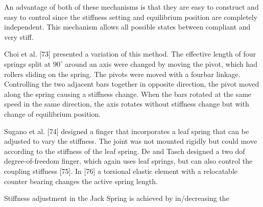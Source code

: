 \documentclass[10pt]{article}
\begin{document}
An advantage of both of these mechanisms is that they are easy to construct and easy to control since the stiffness setting and equilibrium position are completely independent. This mechanism allows all possible states between compliant and very stiff.

Choi et al. [73] presented a variation of this method. The effective length of four springs split at $90^{\circ}$ around an axis were changed by moving the pivot, which had rollers sliding on the spring. The pivots were moved with a fourbar linkage. Controlling the two adjacent bars together in opposite direction, the pivot moved along the spring causing a stiffness change. When the bars rotated at the same speed in the same direction, the axis rotates without stiffness change but with change of equilibrium position.

Sugano et al. [74] designed a finger that incorporates a leaf spring that can be adjusted to vary the stiffness. The joint was not mounted rigidly but could move according to the stiffness of the leaf spring. De and Tasch designed a two dof degree-of-freedom finger, which again uses leaf springs, but can also control the coupling stiffness [75]. In [76] a torsional elastic element with a relocatable counter bearing changes the active spring length.

Stiffness adjustment in the Jack Spring is achieved by in/decreasing the
\end{document}
